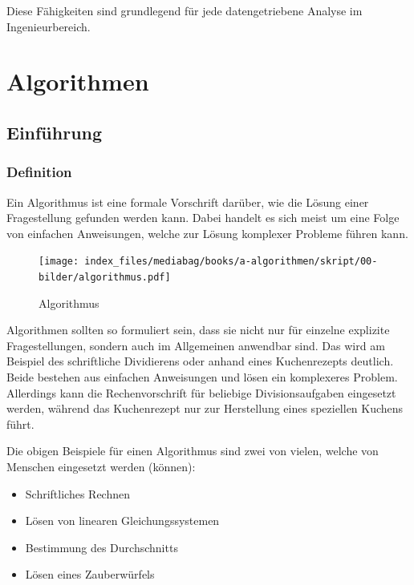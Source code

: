 \documentclass[
  letterpaper,
  DIV=11,
  numbers=noendperiod]{scrreprt}
\providecommand{\tightlist}{%
  \setlength{\itemsep}{0pt}\setlength{\parskip}{0pt}}\usepackage{longtable,booktabs,array}
\begin{document}
Diese Fähigkeiten sind grundlegend für jede datengetriebene Analyse im
Ingenieurbereich.

\part{Algorithmen}

\chapter{Einführung}\label{einfuxfchrung-1}

\section{Definition}\label{definition-1}

Ein Algorithmus ist eine formale Vorschrift darüber, wie die Lösung
einer Fragestellung gefunden werden kann. Dabei handelt es sich meist um
eine Folge von einfachen Anweisungen, welche zur Lösung komplexer
Probleme führen kann.

\begin{figure}[H]

{\centering \texttt{[image: index\_files/mediabag/books/a-algorithmen/skript/00-bilder/algorithmus.pdf]}

}

\caption{Algorithmus}

\end{figure}%

Algorithmen sollten so formuliert sein, dass sie nicht nur für einzelne
explizite Fragestellungen, sondern auch im Allgemeinen anwendbar sind.
Das wird am Beispiel des schriftliche Dividierens oder anhand eines
Kuchenrezepts deutlich. Beide bestehen aus einfachen Anweisungen und
lösen ein komplexeres Problem. Allerdings kann die Rechenvorschrift für
beliebige Divisionsaufgaben eingesetzt werden, während das Kuchenrezept
nur zur Herstellung eines speziellen Kuchens führt.

Die obigen Beispiele für einen Algorithmus sind zwei von vielen, welche
von Menschen eingesetzt werden (können):

\begin{itemize}
\tightlist
\item
  Schriftliches Rechnen
\item
  Lösen von linearen Gleichungssystemen
\item
  Bestimmung des Durchschnitts
\item
  Lösen eines Zauberwürfels
\end{itemize}
\end{document}
